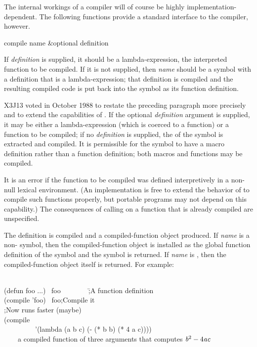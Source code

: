 The internal workings of a compiler will of course be highly
implementation-dependent.  The following functions provide a standard
interface to the compiler, however.


\begin{defun}[Function]
compile name &optional definition

\begin{obsolete}\noindent
If {\it definition} is supplied, it should be a lambda-expression,
the interpreted function to be compiled.  If it is not supplied,
then {\it name} should be a symbol with a definition that is a
lambda-expression; that definition is compiled
and the resulting compiled code is put back into the symbol
as its function definition.
\end{obsolete}

\begin{newer}
X3J13 voted in October 1988 
to restate the preceding paragraph more precisely and to extend the
capabilities of .
If the optional {\it definition} argument is supplied,
it may be either a lambda-expression (which is coerced to a function)
or a function to be compiled; if no {\it definition} is supplied,
the  of the symbol is extracted and compiled.
It is permissible for the symbol to have a macro definition rather than
a function definition; both macros and functions may be compiled.

It is an error if the function to be compiled was defined interpretively
in a non-null lexical environment.  (An implementation is free to extend
the behavior of  to compile such functions properly, but
portable programs may not depend on this capability.)  The consequences
of calling  on a function that is already compiled
are unspecified.
\end{newer}

\begin{obsolete}
The definition is compiled and a compiled-function object produced.
If {\it name} is a non-{\nil}
symbol, then the compiled-function object is installed as the
global function definition of the symbol and the symbol is returned.
If {\it name} is {\false}, then the compiled-function object itself is returned.
For example:
\begin{lisp}
\\
(defun foo ...) \EV\ foo~~~~~~~~\=;{\rm A function definition} \\
(compile 'foo) \EV\ foo\>;{\rm Compile it} \\
\>;{\rm Now  runs faster (maybe)} \\[4pt]
(compile {\false} \\
~~~~~~~~~'(lambda (a b c) (- (* b b) (* 4 a c)))) \\
~~~\EV\ {\rm a compiled function of three arguments that computes ${\it b}^2-4{\it a}{\it c}$}
\end{lisp}
\end{obsolete}


\end{defun}
